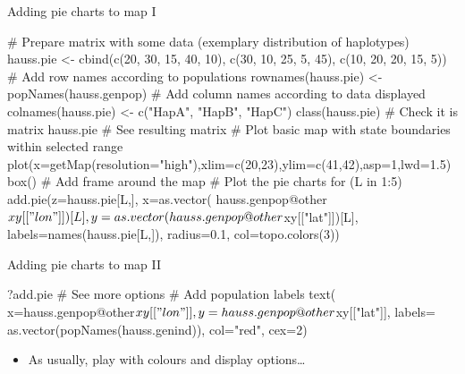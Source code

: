 \documentclass[compress, ucs, xelatex, 11pt, xcolor=svgnames, aspectratio=169,
	hyperref={
		bookmarks=true,
		unicode=true,
		colorlinks=true,
		pdftitle={Molecular data in R},
		plainpages=false,
		pdfauthor={Vojtech Zeisek},
		pdfsubject={Course about phylogeny and evolution in R},
		pdfcreator={XeLaTeX},
		pdfkeywords={R, evolution, phylogeny, molecular data},
		linkcolor=Crimson, %
		anchorcolor=Magenta, %
		citecolor=Magenta, %
		filecolor=Magenta, %
		menucolor=Magenta, %
		urlcolor=DodgerBlue, %
		pdftex},
	url={hyphens, lowtilde} %
	]{beamer}
\renewcommand{\texttt}[1]{\colorbox{Beige}{{\ttfamily #1}}}
\begin{document}
\begin{frame}[fragile]{Adding pie charts to map I}
	\begin{spluscode}
    # Prepare matrix with some data (exemplary distribution of haplotypes)
    hauss.pie <- cbind(c(20, 30, 15, 40, 10), c(30, 10, 25, 5, 45),
      c(10, 20, 20, 15, 5))
    # Add row names according to populations
    rownames(hauss.pie) <- popNames(hauss.genpop)
    # Add column names according to data displayed
    colnames(hauss.pie) <- c("HapA", "HapB", "HapC")
    class(hauss.pie) # Check it is matrix
    hauss.pie # See resulting matrix
    # Plot basic map with state boundaries within selected range
    plot(x=getMap(resolution="high"),xlim=c(20,23),ylim=c(41,42),asp=1,lwd=1.5)
    box() # Add frame around the map
    # Plot the pie charts
    for (L in 1:5) { add.pie(z=hauss.pie[L,], x=as.vector(
      hauss.genpop@other$xy[["lon"]])[L], y=as.vector(
      hauss.genpop@other$xy[["lat"]])[L], labels=names(hauss.pie[L,]),
      radius=0.1, col=topo.colors(3)) }
	\end{spluscode}
\end{frame}

\begin{frame}[fragile]{Adding pie charts to map II}
	\begin{multicols}{2}
		\begin{spluscode}
    ?add.pie # See more options
    # Add population labels
    text(
      x=hauss.genpop@other$xy[["lon"]],
      y=hauss.genpop@other$xy[["lat"]],
      labels=
      as.vector(popNames(hauss.genind)),
      col="red", cex=2)
		\end{spluscode}
		\begin{itemize}
			\item As usually, play with colours and display options\ldots
		\end{itemize}
		\begin{center}
			\texttt{[image: map\_pie.png]}
		\end{center}
	\end{multicols}
\end{frame}
\end{document}

